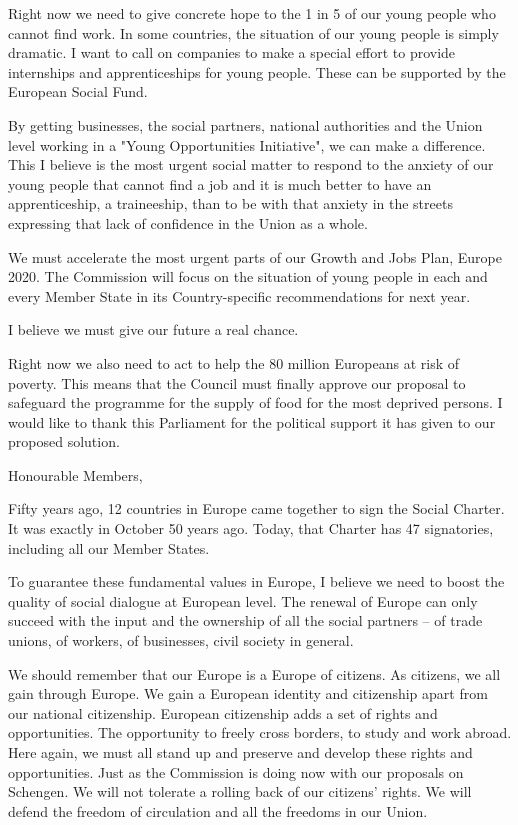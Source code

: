 \documentclass[a4paper,11pt]{article}
\begin{document}
Right now we need to give concrete hope to the 1 in 5 of our young people who cannot find work. In some countries, the situation of our young people is simply dramatic. I want to call on companies to make a special effort to provide internships and apprenticeships for young people. These can be supported by the European Social Fund.

By getting businesses, the social partners, national authorities and the Union level working in a "Young Opportunities Initiative", we can make a difference. This I believe is the most urgent social matter to respond to the anxiety of our young people that cannot find a job and it is much better to have an apprenticeship, a traineeship, than to be with that anxiety in the streets expressing that lack of confidence in the Union as a whole.

We must accelerate the most urgent parts of our Growth and Jobs Plan, Europe 2020. The Commission will focus on the situation of young people in each and every Member State in its Country-specific recommendations for next year.

I believe we must give our future a real chance.

Right now we also need to act to help the 80 million Europeans at risk of poverty. This means that the Council must finally approve our proposal to safeguard the programme for the supply of food for the most deprived persons. I would like to thank this Parliament for the political support it has given to our proposed solution.

Honourable Members,

Fifty years ago, 12 countries in Europe came together to sign the Social Charter. It was exactly in October 50 years ago. Today, that Charter has 47 signatories, including all our Member States.

To guarantee these fundamental values in Europe, I believe we need to boost the quality of social dialogue at European level. The renewal of Europe can only succeed with the input and the ownership of all the social partners – of trade unions, of workers, of businesses, civil society in general.

We should remember that our Europe is a Europe of citizens. As citizens, we all gain through Europe. We gain a European identity and citizenship apart from our national citizenship. European citizenship adds a set of rights and opportunities. The opportunity to freely cross borders, to study and work abroad. Here again, we must all stand up and preserve and develop these rights and opportunities. Just as the Commission is doing now with our proposals on Schengen. We will not tolerate a rolling back of our citizens' rights. We will defend the freedom of circulation and all the freedoms in our Union.
\end{document}
